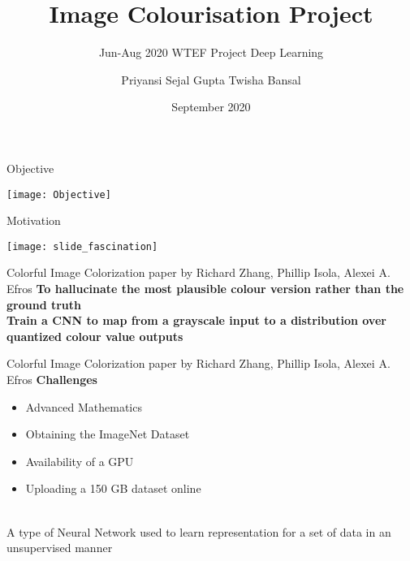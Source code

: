 \documentclass[12pt]{beamer}
\title[Image-Colourization]{Image Colourisation Project}
\subtitle{Jun-Aug 2020 {\textbar} WTEF Project {\textbar} Deep Learning}
\author[Team-9]{Priyansi {\textbar} Sejal Gupta {\textbar} Twisha Bansal}
\date{September 2020}
\begin{document}
\begin{frame}
        \titlepage
\end{frame}

\begin{frame}{Objective}
	\begin{center}
		\texttt{[image: Objective]}
	\end{center}
\end{frame}

\begin{frame}{Motivation}
	\begin{center}
		\texttt{[image: slide\_fascination]}
	\end{center}
\end{frame}

\begin{frame}[standout]
\end{frame}

\begin{frame}{Colorful Image Colorization paper by Richard Zhang, Phillip Isola, Alexei A. Efros}
	\textbf{To hallucinate the most plausible colour version rather than the ground truth}\\
	\vspace{10 mm}
	\pause
	\textbf{Train a CNN to map from a grayscale input to a distribution over quantized
	colour value outputs}
\end{frame}

\begin{frame}{Colorful Image Colorization paper by Richard Zhang, Phillip Isola, Alexei A. Efros}
	\textbf{Challenges}\\
	\begin{itemize}
		\item Advanced Mathematics
		\item Obtaining the ImageNet Dataset
		\item Availability of a GPU
		\item Uploading a 150 GB dataset online
	\end{itemize}
\end{frame}

\begin{frame}[standout]
	\\
	A type of Neural Network used to learn representation for a set of data in an unsupervised manner
\end{frame}
\end{document}
